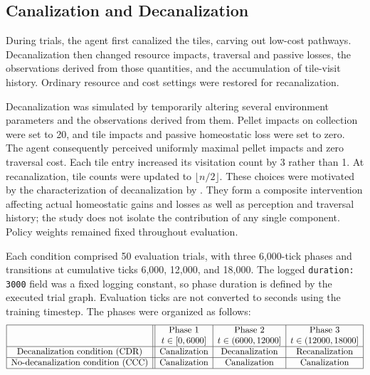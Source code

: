 \documentclass[12pt,fleqn]{article}
\begin{document}
\subsection{Canalization and Decanalization}

During trials, the agent first canalized the tiles, carving out low-cost pathways. Decanalization then changed resource impacts, traversal and passive losses, the observations derived from those quantities, and the accumulation of tile-visit history. Ordinary resource and cost settings were restored for recanalization.

Decanalization was simulated by temporarily altering several environment parameters and the observations derived from them. Pellet impacts on collection were set to 20, and tile impacts and passive homeostatic loss were set to zero. The agent consequently perceived uniformly maximal pellet impacts and zero traversal cost. Each tile entry increased its visitation count by 3 rather than 1. At recanalization, tile counts were updated to $\lfloor n/2\rfloor$. These choices were motivated by the characterization of decanalization by \cite{juliani_deep_2024}. They form a composite intervention affecting actual homeostatic gains and losses as well as perception and traversal history; the study does not isolate the contribution of any single component. Policy weights remained fixed throughout evaluation.

Each condition comprised 50 evaluation trials, with three 6,000-tick phases and transitions at cumulative ticks 6,000, 12,000, and 18,000. The logged \texttt{duration: 3000} field was a fixed logging constant, so phase duration is defined by the executed trial graph. Evaluation ticks are not converted to seconds using the training timestep. The phases were organized as follows:
{\scriptsize
\[
  \begin{array}{|c||c|c|c|}
    \hline
     & \text{Phase 1}        & \text{Phase 2}   & \text{Phase 3}    \\
     & t\in[0,6000]          & t\in(6000,12000] & t\in(12000,18000] \\
    \hline
    \text{Decanalization condition (CDR)}
     & \text{Canalization}
     & \text{Decanalization}
     & \text{Recanalization}                                        \\
    \hline
    \text{No-decanalization condition (CCC)}
     & \text{Canalization}
     & \text{Canalization}
     & \text{Canalization}                                          \\
    \hline
  \end{array}
\]
}
\end{document}
